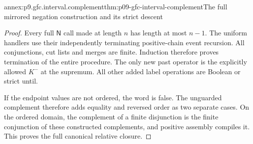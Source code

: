 \begin{annexitem}{annex:p9.gfc.interval.complement}{thm:p09-gfc-interval-complement}{The full mirrored negation construction and its strict descent}
\begin{proof}
Every full
\(\mathsf N\)
call made
at length
\(n\) has
length at
most \(n-1\).
The uniform
handlers use
their independently
terminating
positive-chain
event recursion.
All conjunctions,
cut lists
and merges
are finite.
Induction
therefore proves
termination of
the entire
procedure.
The only
new past
operator is
the explicitly
allowed \(K^-\)
at the
supremum.
All other
added label
operations
are Boolean
or strict
until.

If the
endpoint
values are
not ordered,
the word
is false.
The unguarded
complement
therefore
adds equality
and reversed
order as
two separate
cases. On
the ordered
domain, the
complement of
a finite
disjunction
is the
finite
conjunction
of these
constructed
complements,
and positive
assembly
compiles it.
This proves
the full
canonical
relative
closure.
\end{proof}
\end{annexitem}

